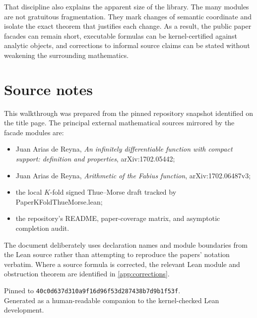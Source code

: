 \documentclass[11pt,a4paper,openany]{book}
\def\module#1{#1.lean}
\newcommand{\module}[1]{\nolinkurl{#1.lean}}
\newcommand{\commit}{\nolinkurl{40c0d637d310a9f16d96f53d287438b7d9b1f53f}}
\begin{document}
That discipline also explains the apparent size of the library.  The many
modules are not gratuitous fragmentation.  They mark changes of semantic
coordinate and isolate the exact theorem that justifies each change.  As a
result, the public paper facades can remain short, executable formulas can be
kernel-certified against analytic objects, and corrections to informal source
claims can be stated without weakening the surrounding mathematics.

\backmatter
\chapter*{Source notes}
This walkthrough was prepared from the pinned repository snapshot identified
on the title page.  The principal external mathematical sources mirrored by
the facade modules are:

\begin{itemize}
  \item Juan Arias de Reyna, \emph{An infinitely differentiable function with
        compact support: definition and properties}, arXiv:1702.05442;
  \item Juan Arias de Reyna, \emph{Arithmetic of the Fabius function},
        arXiv:1702.06487v3;
  \item the local $K$-fold signed Thue--Morse draft tracked by
        \module{PaperKFoldThueMorse};
  \item the repository's README, paper-coverage matrix, and asymptotic
        completion audit.
\end{itemize}

The document deliberately uses declaration names and module boundaries from
the Lean source rather than attempting to reproduce the papers' notation
verbatim.  Where a source formula is corrected, the relevant Lean module and
obstruction theorem are identified in \cref{app:corrections}.

\vfill
\begin{center}
\small\sffamily\color{Ink!70}
Pinned to \commit.\\[.4em]
Generated as a human-readable companion to the kernel-checked Lean development.
\end{center}
\end{document}
